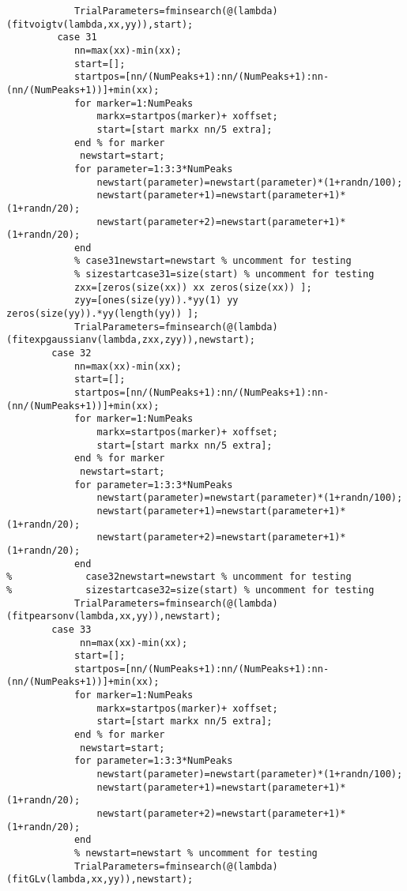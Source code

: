 \begin{lstlisting}
            TrialParameters=fminsearch(@(lambda)(fitvoigtv(lambda,xx,yy)),start);
         case 31
            nn=max(xx)-min(xx);
            start=[];
            startpos=[nn/(NumPeaks+1):nn/(NumPeaks+1):nn-(nn/(NumPeaks+1))]+min(xx);
            for marker=1:NumPeaks
                markx=startpos(marker)+ xoffset;
                start=[start markx nn/5 extra];
            end % for marker
             newstart=start;
            for parameter=1:3:3*NumPeaks
                newstart(parameter)=newstart(parameter)*(1+randn/100);
                newstart(parameter+1)=newstart(parameter+1)*(1+randn/20);
                newstart(parameter+2)=newstart(parameter+1)*(1+randn/20);
            end
            % case31newstart=newstart % uncomment for testing
            % sizestartcase31=size(start) % uncomment for testing
            zxx=[zeros(size(xx)) xx zeros(size(xx)) ];
            zyy=[ones(size(yy)).*yy(1) yy zeros(size(yy)).*yy(length(yy)) ];
            TrialParameters=fminsearch(@(lambda)(fitexpgaussianv(lambda,zxx,zyy)),newstart);
        case 32
            nn=max(xx)-min(xx);
            start=[];
            startpos=[nn/(NumPeaks+1):nn/(NumPeaks+1):nn-(nn/(NumPeaks+1))]+min(xx);
            for marker=1:NumPeaks
                markx=startpos(marker)+ xoffset;
                start=[start markx nn/5 extra];
            end % for marker
             newstart=start;
            for parameter=1:3:3*NumPeaks
                newstart(parameter)=newstart(parameter)*(1+randn/100);
                newstart(parameter+1)=newstart(parameter+1)*(1+randn/20);
                newstart(parameter+2)=newstart(parameter+1)*(1+randn/20);
            end
%             case32newstart=newstart % uncomment for testing
%             sizestartcase32=size(start) % uncomment for testing
            TrialParameters=fminsearch(@(lambda)(fitpearsonv(lambda,xx,yy)),newstart);
        case 33
             nn=max(xx)-min(xx);
            start=[];
            startpos=[nn/(NumPeaks+1):nn/(NumPeaks+1):nn-(nn/(NumPeaks+1))]+min(xx);
            for marker=1:NumPeaks
                markx=startpos(marker)+ xoffset;
                start=[start markx nn/5 extra];
            end % for marker
             newstart=start;
            for parameter=1:3:3*NumPeaks
                newstart(parameter)=newstart(parameter)*(1+randn/100);
                newstart(parameter+1)=newstart(parameter+1)*(1+randn/20);
                newstart(parameter+2)=newstart(parameter+1)*(1+randn/20);
            end
            % newstart=newstart % uncomment for testing
            TrialParameters=fminsearch(@(lambda)(fitGLv(lambda,xx,yy)),newstart);

\end{lstlisting}
